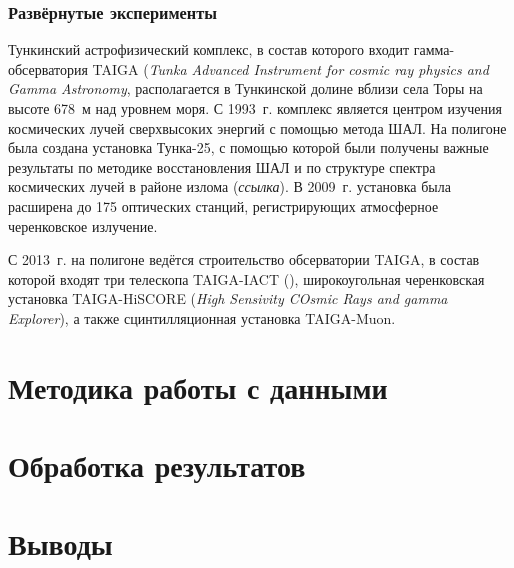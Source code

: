 \documentclass[magd,floatypics,numeref]{msudipl} %
\begin{document}
\subsection{Развёрнутые эксперименты}
Тункинский астрофизический комплекс, в состав которого входит гамма-обсерватория TAIGA (\textit{Tunka Advanced Instrument for cosmic ray physics and Gamma Astronomy}, располагается в Тункинской долине вблизи села Торы на высоте 678~м над уровнем моря. С 1993~г. комплекс является центром изучения космических лучей сверхвысоких энергий с помощью метода ШАЛ. На полигоне была создана установка Тунка-25, с помощью которой были получены важные результаты по методике восстановления ШАЛ и по структуре спектра космических лучей в районе излома (\textit{ссылка}). В 2009~г. установка была расширена до 175 оптических станций, регистрирующих атмосферное черенковское излучение. 

С 2013~г. на полигоне ведётся строительство обсерватории TAIGA, в состав которой входят три телескопа TAIGA-IACT (), широкоугольная черенковская установка TAIGA-HiSCORE (\textit{High Sensivity COsmic Rays and gamma Explorer}), а также сцинтилляционная установка TAIGA-Muon.
\chapter{Методика работы с данными}
\chapter{Обработка результатов}

\chapter*{Выводы}   %


{}  %
\printbibliography[title=Литература]
\end{document}
